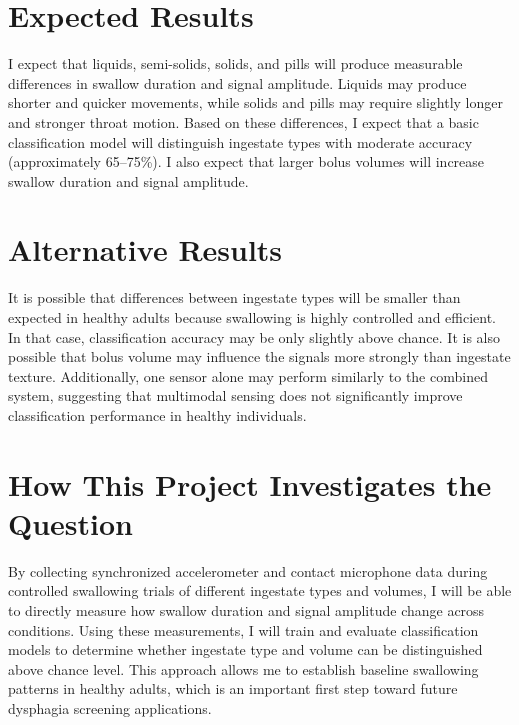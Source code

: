 \documentclass[conference]{IEEEtran}
\begin{document}
\section{Expected Results}
I expect that liquids, semi-solids, solids, and pills will produce measurable differences in swallow duration and signal amplitude. Liquids may produce shorter and quicker movements, while solids and pills may require slightly longer and stronger throat motion. Based on these differences, I expect that a basic classification model will distinguish ingestate types with moderate accuracy (approximately 65--75\%). I also expect that larger bolus volumes will increase swallow duration and signal amplitude.

\section{Alternative Results}
It is possible that differences between ingestate types will be smaller than expected in healthy adults because swallowing is highly controlled and efficient. In that case, classification accuracy may be only slightly above chance. It is also possible that bolus volume may influence the signals more strongly than ingestate texture. Additionally, one sensor alone may perform similarly to the combined system, suggesting that multimodal sensing does not significantly improve classification performance in healthy individuals.

\section{How This Project Investigates the Question}
By collecting synchronized accelerometer and contact microphone data during controlled swallowing trials of different ingestate types and volumes, I will be able to directly measure how swallow duration and signal amplitude change across conditions. Using these measurements, I will train and evaluate classification models to determine whether ingestate type and volume can be distinguished above chance level. This approach allows me to establish baseline swallowing patterns in healthy adults, which is an important first step toward future dysphagia screening applications.
\end{document}
